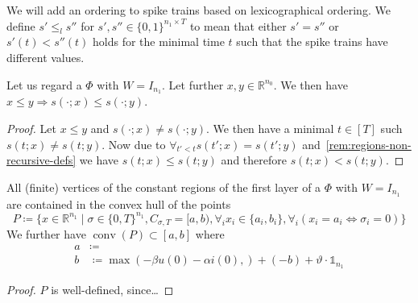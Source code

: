 We will add an ordering to spike trains based on lexicographical ordering. We define \(s'≤_ls''\) for \(s',s''∈\{0,1\}^{n_1×T}\) to mean that either \(s'=s''\) or \(s'(t)<s''(t)\) holds for the minimal time \(t\) such that the spike trains have different values.

\begin{lemma}
  Let us regard a \rdtlifsnn \(Φ\) with \(W=I_{n_1}\).
  Let further \(x,y∈ℝ^{n_0}\). We then have \(x≤y⇒s(·;x)≤s(·;y)\).
\end{lemma}

\begin{proof}
  Let \(x≤y\) and \(s(·;x)≠s(·;y)\). We then have a minimal \(t∈[T]\) such \(s(t;x)≠s(t;y)\). Now due to \(∀_{t'<t}s(t';x)=s(t';y)\) and~\autoref{rem:regions-non-recursive-defs} we have \(s(t;x)≤s(t;y)\) and therefore \(s(t;x)<s(t;y)\).
\end{proof}

\begin{lemma}
  All (finite) vertices of the constant regions of the first layer of a \rdtlifsnn \(Φ\) with \(W=I_{n_1}\) are contained in the convex hull of the points
  \[ P≔\{x∈ℝ^{n_1}\mid σ∈\{0,T\}^{n_1},C_{σ,T}=[a,b),∀_ix_i∈\{a_i,b_i\},∀_i(x_i=a_i⇔σ_i=0)\} \]
  We further have \(\operatorname{conv}(P)⊂[a,b]\) where
  \begin{align*}
   a &≔ \\
   b &≔\max(-βu(0)-αi(0),)+(-b)+ϑ·𝟙_{n_1}
  \end{align*}
\end{lemma}

\begin{proof}
  \(P\) is well-defined, since…
\end{proof}






